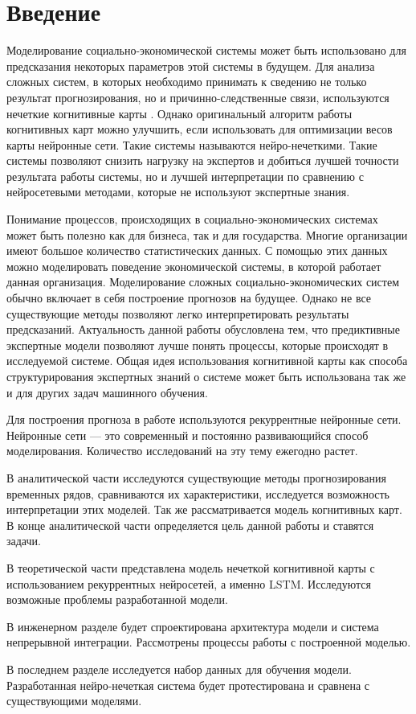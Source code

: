 \chapter*{Введение}
\label{sec:afterwords}

Моделирование социально-экономической системы может быть использовано для предсказания
некоторых параметров этой системы в будущем.
Для анализа сложных систем, в которых необходимо принимать к сведению
не только результат прогнозирования, но и причинно-следственные связи,
используются нечеткие когнитивные карты \cite{osoba2019dags, kosko1986fuzzy}.
Однако оригинальный алгоритм работы когнитивных карт можно улучшить,
если использовать для оптимизации весов карты нейронные сети.
Такие системы называются нейро-нечеткими.
Такие системы позволяют снизить нагрузку на экспертов и
добиться лучшей точности результата работы системы, но и лучшей интерпретации по сравнению
с нейросетевыми методами, которые не используют экспертные знания.

Понимание процессов, происходящих в социально-экономических системах
может быть полезно как для бизнеса, так и для государства.
Многие организации имеют большое количество статистических данных.
С помощью этих данных можно моделировать поведение
экономической системы, в которой работает данная организация.
Моделирование сложных социально-экономических систем обычно
включает в себя построение прогнозов на будущее.
Однако не все существующие методы позволяют
легко интерпретировать результаты предсказаний.
Актуальность данной работы обусловлена тем, что предиктивные экспертные модели
позволяют лучше понять процессы, которые происходят в
исследуемой системе. Общая идея использования когнитивной карты
как способа структурирования экспертных знаний о системе
может быть использована так же и для других задач машинного обучения.

Для построения прогноза в работе используются рекуррентные нейронные
сети. Нейронные сети --- это современный и постоянно
развивающийся способ моделирования. Количество исследований
на эту тему ежегодно растет.

В аналитической части исследуются существующие методы прогнозирования
временных рядов, сравниваются их характеристики, исследуется
возможность интерпретации этих моделей. Так же рассматривается
модель когнитивных карт. В конце аналитической части определяется
цель данной работы и ставятся задачи.

В теоретической части представлена модель нечеткой когнитивной карты с использованием
рекуррентных нейросетей, а именно LSTM. Исследуются возможные проблемы разработанной модели.

В инженерном разделе будет спроектирована архитектура модели и
система непрерывной интеграции. Рассмотрены процессы работы с построенной моделью.

В последнем разделе исследуется набор данных для обучения модели.
Разработанная нейро-нечеткая система будет протестирована и сравнена
с существующими моделями.